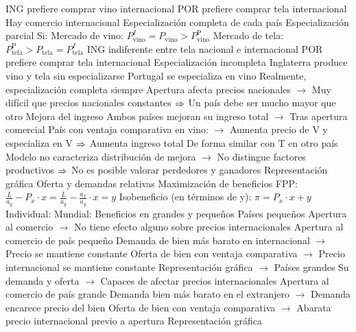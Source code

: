 \documentclass{nuevotema}
\begin{document}
\begin{esquemal}
				\4 ING prefiere comprar vino internacional
				\4 POR prefiere comprar tela internacional
				\4[$\then$] Hay comercio internacional
				\4[$\then$] Especialización completa de cada país
			\3 Especialización parcial
				\4 Si:
				\4[] Mercado de vino: $P_\textrm{vino}^I = P_\textrm{vino} > P_\textrm{vino}^\textrm{P} $
				\4[] Mercado de tela:  $P_\textrm{tela}^\textrm{P} > P_\textrm{tela} = P_\textrm{tela}^I$
				\4 ING indiferente entre tela nacional e internacional
				\4 POR prefiere comprar tela internacional
				\4[$\then$] Especialización incompleta
				\4[$\then$] Inglaterra produce vino y tela sin especializarse
				\4[$\then$] Portugal se especializa en vino
				\4 Realmente, especialización completa siempre
				\4[] Apertura afecta precios nacionales
				\4[] $\to$ Muy difícil que precios nacionales constantes
				\4[] $\then$ Un país debe ser mucho mayor que otro
			\3 Mejora del ingreso
				\4 Ambos países mejoran su ingreso total
				\4[] $\to$ Tras apertura comercial
				\4 País con ventaja comparativa en vino:
				\4[] $\to$ Aumenta precio de V y especializa en V
				\4[] $\then$ Aumenta ingreso total
				\4 De forma similar con T en otro país
				\4 Modelo no caracteriza distribución de mejora
				\4[] $\to$ No distingue factores productivos
				\4[] $\then$ No es posible valorar perdedores y ganadores
			\3 Representación gráfica
				\4 Oferta y demandas relativas
				\4[] 
				\4 Maximización de beneficios
				\4[] FPP: $\frac{\bar{L}}{a_y} - P_x \cdot x = \frac{\bar{L}}{a_y} - \frac{a_x}{a_y} \cdot x = y$
				\4[] Isobeneficio (en términos de y):  $\pi = P_x \cdot x + y$
				\4[] Individual: 
				\4[] Mundial: 
			\3 Beneficios en grandes y pequeños
				\4 Países pequeños
				\4[] Apertura al comercio
				\4[] $\to$ No tiene efecto alguno sobre precios internacionales
				\4 Apertura al comercio de país pequeño
				\4[] Demanda de bien más barato en internacional
				\4[] $\to$ Precio se mantiene constante
				\4[] Oferta de bien con ventaja comparativa
				\4[] $\to$ Precio internacional se mantiene constante
				\4[] Representación gráfica
				\4[] $\to$ 
				\4 Países grandes
				\4[] Su demanda y oferta
				\4[] $\to$ Capaces de afectar precios internacionales
				\4 Apertura al comercio de país grande
				\4[] Demanda bien más barato en el extranjero
				\4[] $\to$ Demanda encarece precio del bien
				\4[] Oferta de bien con ventaja comparativa
				\4[] $\to$ Abarata precio internacional previo a apertura
				\4[] Representación gráfica

\end{esquemal}
\end{document}

